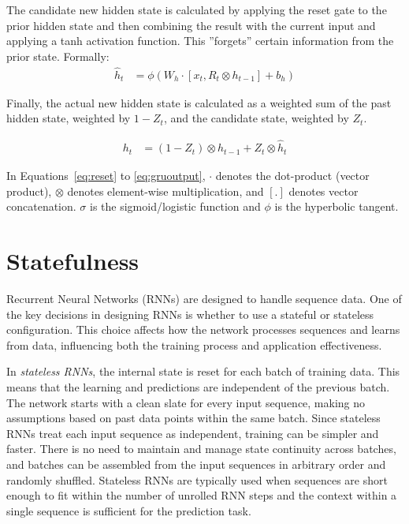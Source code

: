 The candidate new hidden state is calculated by applying the reset gate to the prior hidden state and then combining the result with the current input and applying a tanh activation function. This ''forgets'' certain information from the prior state. Formally:
\begin{align}
\hat{h}_t &= \phi (W_h \cdot [x_t, R_t \otimes h_{t-1}] + b_h) \label{eq:candidategru}
\end{align}

Finally, the actual new hidden state is calculated as a weighted sum of the past hidden state, weighted by $1-Z_t$, and the candidate state, weighted by $Z_t$.

\begin{align}
h_t &= (1 - Z_t) \otimes h_{t-1} + Z_t \otimes \hat{h}_t \label{eq:gruoutput}
\end{align}

In Equations~\ref{eq:reset} to \ref{eq:gruoutput}, $\cdot$ denotes the dot-product (vector product), $\otimes$ denotes element-wise multiplication, and $[.]$ denotes vector concatenation.  $\sigma$ is the sigmoid/logistic function and $\phi$ is the hyperbolic tangent.

\section{Statefulness}

Recurrent Neural Networks (RNNs) are designed to handle sequence data. One of the key decisions in designing RNNs is whether to use a stateful or stateless configuration. This choice affects how the network processes sequences and learns from data, influencing both the training process and application effectiveness.

In \emph{stateless RNNs}, the internal state is reset for each batch of training data. This means that the learning and predictions are independent of the previous batch. The network starts with a clean slate for every input sequence, making no assumptions based on past data points within the same batch. Since stateless RNNs treat each input sequence as independent, training can be simpler and faster. There is no need to maintain and manage state continuity across batches, and batches can be assembled from the input sequences in arbitrary order and randomly shuffled. Stateless RNNs are typically used when sequences are short enough to fit within the number of unrolled RNN steps and the context within a single sequence is sufficient for the prediction task.


